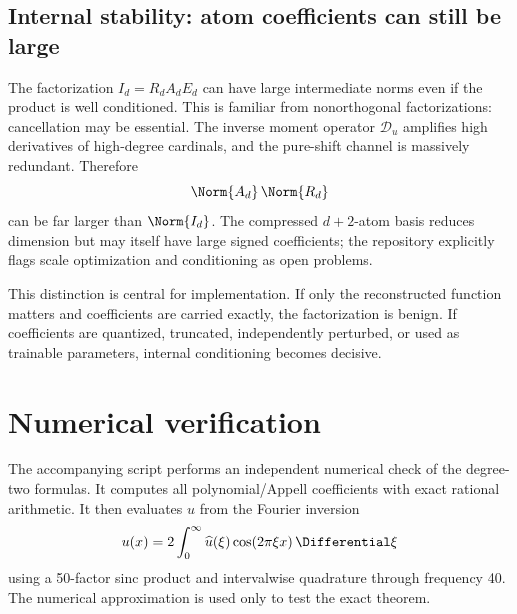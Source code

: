 \documentclass[11pt,oneside]{article}
\numberwithin{equation}{section}
\theoremstyle{definition}
\theoremstyle{remark}
\newcommand{\calD}{\mathscr D_u}
\begin{document}
\subsection{Internal stability: atom coefficients can still be large}
The factorization
\(I_d=R_dA_dE_d\) can have large intermediate norms even if the product is well
conditioned.  This is familiar from nonorthogonal factorizations: cancellation may
be essential.  The inverse moment operator \(\calD\) amplifies high derivatives of
high-degree cardinals, and the pure-shift channel is massively redundant.
Therefore
\begin{equation}
 \Norm{A_d}\,\Norm{R_d}
 \label{eq:internal-bound}
\end{equation}
can be far larger than \(\Norm{I_d}\).  The compressed \(d+2\)-atom basis reduces
dimension but may itself have large signed coefficients; the repository explicitly
flags scale optimization and conditioning as open problems.

This distinction is central for implementation.  If only the reconstructed
function matters and coefficients are carried exactly, the factorization is benign.
If coefficients are quantized, truncated, independently perturbed, or used as
trainable parameters, internal conditioning becomes decisive.

\section{Numerical verification}
\label{sec:numerics}
The accompanying script
 performs an independent numerical
check of the degree-two formulas.  It computes all polynomial/Appell coefficients
with exact rational arithmetic.  It then evaluates \(u\) from the Fourier inversion
\begin{equation}
 u(x)=2\int_0^\infty\widehat u(\xi)\cos(2\pi\xi x)\,\Differential\xi
 \label{eq:fourier-inversion}
\end{equation}
using a 50-factor sinc product and intervalwise quadrature through frequency 40.
The numerical approximation is used only to test the exact theorem.
\end{document}
